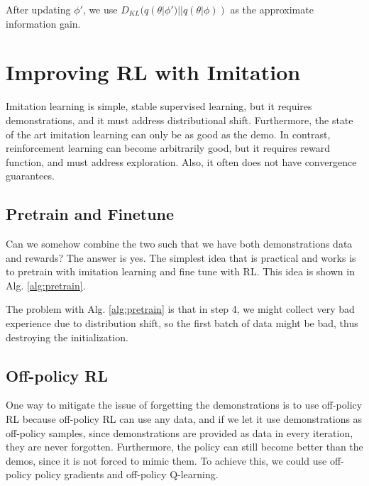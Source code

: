 After updating $\phi'$, we use $D_{KL}(q(\theta|\phi')||q(\theta|\phi))$ as the approximate information gain. 

\section{Improving RL with Imitation}
Imitation learning is simple, stable supervised learning, but it requires demonstrations, and it must address distributional shift. Furthermore, the state of the art imitation learning can only be as good as the demo. In contrast, reinforcement learning can become arbitrarily good, but it requires reward function, and must address exploration. Also, it often does not have convergence guarantees.
\subsection{Pretrain and Finetune}
Can we somehow combine the two such that we have both demonstrations data and rewards? The answer is yes. The simplest idea that is practical and works is to pretrain with imitation learning and fine tune with RL. This idea is shown in Alg. \ref{alg:pretrain}. 


The problem with Alg. \ref{alg:pretrain} is that in step 4, we might collect very bad experience due to distribution shift, so the first batch of data might be bad, thus destroying the initialization. 

\subsection{Off-policy RL}
One way to mitigate the issue of forgetting the demonstrations is to use off-policy RL because off-policy RL can use any data, and if we let it use demonstrations as off-policy samples, since demonstrations are provided as data in every iteration, they are never forgotten. Furthermore, the policy can still become better than the demos, since it is not forced to mimic them. To achieve this, we could use off-policy policy gradients and off-policy Q-learning. 

